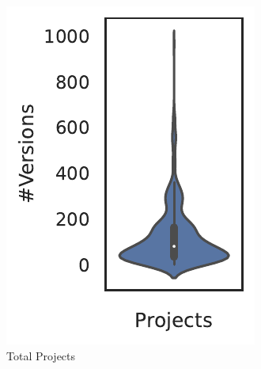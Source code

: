 \begin{figure}
	\begin{subfigure}{0.31\columnwidth}
			\includegraphics[width=\textwidth]{chapters/ch3/figs/no_pkg_vers.pdf}
		    \caption{Total Projects}
		    \label{ch3:fig:dist_no_vers}
	\end{subfigure}
\hfill
\begin{subfigure}{0.31\columnwidth}

\end{subfigure}
\end{figure}
